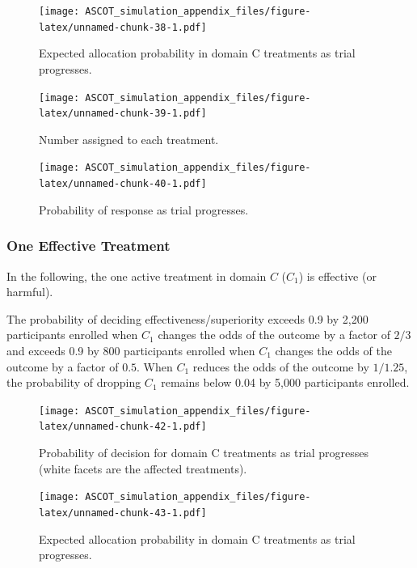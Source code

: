 \documentclass[
]{article}
\begin{document}
\begin{figure}
\centering
\texttt{[image: ASCOT\_simulation\_appendix\_files/figure-latex/unnamed-chunk-38-1.pdf]}
\caption{\label{fig:unnamed-chunk-38}Expected allocation probability in domain C treatments as trial progresses.}
\end{figure}

\begin{figure}
\centering
\texttt{[image: ASCOT\_simulation\_appendix\_files/figure-latex/unnamed-chunk-39-1.pdf]}
\caption{\label{fig:unnamed-chunk-39}Number assigned to each treatment.}
\end{figure}

\begin{figure}
\centering
\texttt{[image: ASCOT\_simulation\_appendix\_files/figure-latex/unnamed-chunk-40-1.pdf]}
\caption{\label{fig:unnamed-chunk-40}Probability of response as trial progresses.}
\end{figure}

\clearpage

\hypertarget{one-effective-treatment}{%
\subsubsection{One Effective Treatment}\label{one-effective-treatment}}

In the following, the one active treatment in domain \(C\) (\(C_1\)) is effective (or harmful).

The probability of deciding effectiveness/superiority exceeds 0.9 by 2,200 participants enrolled when \(C_1\) changes the odds of the outcome by a factor of \(2/3\) and exceeds 0.9 by 800 participants enrolled when \(C_1\) changes the odds of the outcome by a factor of \(0.5\).
When \(C_1\) reduces the odds of the outcome by \(1/1.25\), the probability of dropping \(C_1\) remains below 0.04 by 5,000 participants enrolled.

\begin{figure}
\centering
\texttt{[image: ASCOT\_simulation\_appendix\_files/figure-latex/unnamed-chunk-42-1.pdf]}
\caption{\label{fig:unnamed-chunk-42}Probability of decision for domain C treatments as trial progresses (white facets are the affected treatments).}
\end{figure}

\begin{figure}
\centering
\texttt{[image: ASCOT\_simulation\_appendix\_files/figure-latex/unnamed-chunk-43-1.pdf]}
\caption{\label{fig:unnamed-chunk-43}Expected allocation probability in domain C treatments as trial progresses.}
\end{figure}
\end{document}
